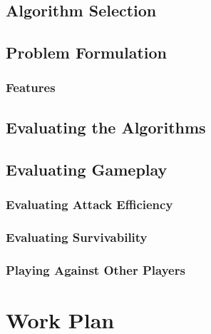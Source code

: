 \documentclass[a4paper, 12pt]{extreport}
\begin{document}
		\section{Algorithm Selection}
			
		
		\section{Problem Formulation}
		
			\subsection{Features}
			
		\section{Evaluating the Algorithms}
		
		\section{Evaluating Gameplay}
			\subsection{Evaluating Attack Efficiency}
			
			\subsection{Evaluating Survivability}
			
			\subsection{Playing Against Other Players}
	
	\chapter{Work Plan}
		
	
	\printbibliography[heading={bibnumbered}, title={References}]
		
\end{document}
